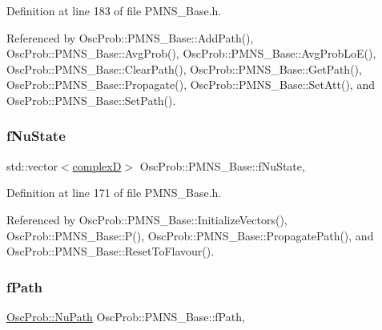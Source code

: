 Definition at line 183 of file P\+M\+N\+S\+\_\+\+Base.\+h.



Referenced by Osc\+Prob\+::\+P\+M\+N\+S\+\_\+\+Base\+::\+Add\+Path(), Osc\+Prob\+::\+P\+M\+N\+S\+\_\+\+Base\+::\+Avg\+Prob(), Osc\+Prob\+::\+P\+M\+N\+S\+\_\+\+Base\+::\+Avg\+Prob\+Lo\+E(), Osc\+Prob\+::\+P\+M\+N\+S\+\_\+\+Base\+::\+Clear\+Path(), Osc\+Prob\+::\+P\+M\+N\+S\+\_\+\+Base\+::\+Get\+Path(), Osc\+Prob\+::\+P\+M\+N\+S\+\_\+\+Base\+::\+Propagate(), Osc\+Prob\+::\+P\+M\+N\+S\+\_\+\+Base\+::\+Set\+Att(), and Osc\+Prob\+::\+P\+M\+N\+S\+\_\+\+Base\+::\+Set\+Path().

\mbox{\label{classOscProb_1_1PMNS__Base_abf99f2339e3ee989600740b5d88063e8}} 
\subsubsection{\texorpdfstring{f\+Nu\+State}{fNuState}}
{\footnotesize\ttfamily std\+::vector$<$\hyperlink{EigenPoint_8h_a67ca8e107e20610c3fff78d5e726ece0}{complexD}$>$ Osc\+Prob\+::\+P\+M\+N\+S\+\_\+\+Base\+::f\+Nu\+State\hspace{0.3cm}{\ttfamily [protected]}, {\ttfamily [inherited]}}



Definition at line 171 of file P\+M\+N\+S\+\_\+\+Base.\+h.



Referenced by Osc\+Prob\+::\+P\+M\+N\+S\+\_\+\+Base\+::\+Initialize\+Vectors(), Osc\+Prob\+::\+P\+M\+N\+S\+\_\+\+Base\+::\+P(), Osc\+Prob\+::\+P\+M\+N\+S\+\_\+\+Base\+::\+Propagate\+Path(), and Osc\+Prob\+::\+P\+M\+N\+S\+\_\+\+Base\+::\+Reset\+To\+Flavour().

\mbox{\label{classOscProb_1_1PMNS__Base_a849437aa8891fe042e86886ce8f81c6e}} 
\subsubsection{\texorpdfstring{f\+Path}{fPath}}
{\footnotesize\ttfamily \hyperlink{structOscProb_1_1NuPath}{Osc\+Prob\+::\+Nu\+Path} Osc\+Prob\+::\+P\+M\+N\+S\+\_\+\+Base\+::f\+Path\hspace{0.3cm}{\ttfamily [protected]}, {\ttfamily [inherited]}}



